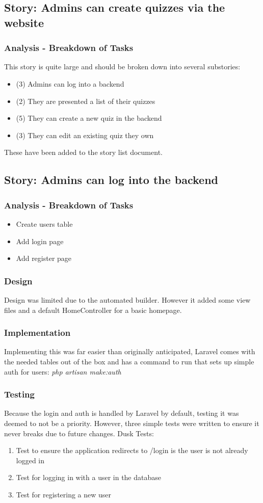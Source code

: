 \subsection{Story: Admins can create quizzes via the website}
\subsubsection{Analysis - Breakdown of Tasks}
This story is quite large and should be broken down into several substories:
\begin{itemize}
	\item (3) Admins can log into a backend
	\item (2) They are presented a list of their quizzes
	\item (5) They can create a new quiz in the backend
	\item (3) They can edit an existing quiz they own
\end{itemize}
These have been added to the story list document.
\newpage

\subsection{Story: Admins can log into the backend}
\subsubsection{Analysis - Breakdown of Tasks}
\begin{itemize}
	\item Create users table
	\item Add login page
	\item Add register page
\end{itemize}
\subsubsection{Design}
Design was limited due to the automated builder. However it added some view files and a default HomeController for a basic homepage.
\subsubsection{Implementation}
Implementing this was far easier than originally anticipated, Laravel comes with the needed tables out of the box and has a command to run that sets up simple auth for users: \textit{php artisan make:auth}
\subsubsection{Testing}
Because the login and auth is handled by Laravel by default, testing it was deemed to not be a priority. However, three simple tests were written to ensure it never breaks due to future changes. Dusk Tests:
\begin{enumerate}
	\item Test to ensure the application redirects to /login is the user is not already logged in
	\item Test for logging in with a user in the database
	\item Test for registering a new user
\end{enumerate}
\newpage

